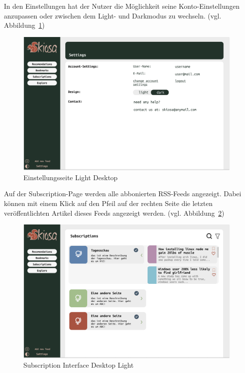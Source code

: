 In den Einstellungen hat der Nutzer die Möglichkeit seine Konto-Einstellungen anzupassen oder zwischen dem Light- und Darkmodus zu wechseln. (vgl. Abbildung~\ref{fig:Settings Interface Desktop Light})

\begin{figure}[H]
    \includegraphics[width=\linewidth]{images/Settings Interface Desktop Lightfigma-mockups.png}
    \caption{Einstellungsseite Light Desktop}
    \label{fig:Settings Interface Desktop Light}
\end{figure}

Auf der Subscription-Page werden alle abbonierten RSS-Feeds angezeigt. Dabei können mit einem Klick auf den Pfeil auf der rechten Seite die letzten veröffentlichten Artikel dieses Feeds angezeigt werden. (vgl. Abbildung~\ref{fig:Subscription Interface Desktop Light})

\begin{figure}[H]
    \includegraphics[width=\linewidth]{images/Subscription Interface Desktop Lightfigma-mockups.png}
    \caption{Subscription Interface Desktop Light}
    \label{fig:Subscription Interface Desktop Light}
\end{figure}


